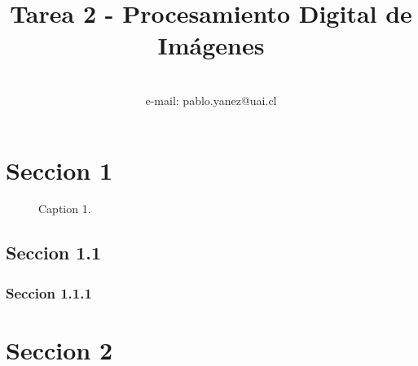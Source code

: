 \documentclass[
  letterpaper,
  twocolumn,
  9pt,
  journal,
  final]{IEEEtran}
\title{Tarea 2 - Procesamiento Digital de Imágenes}
\author{
  \IEEEauthorblockN{Pablo Yáñez S.} \\
  e-mail: pablo.yanez@uai.cl
}
\begin{document}
\maketitle

\tableofcontents

\section{Seccion 1}
\lipsum[1]

\begin{figure}[tbh!]
  \begin{center}
  \end{center}
  \caption{Caption 1.} \label{fig:texto referenecia}
\end{figure}

\subsection{Seccion 1.1}
\lipsum[1]

\subsubsection{Seccion 1.1.1}
\lipsum[1]

\section{Seccion 2}
\end{document}
